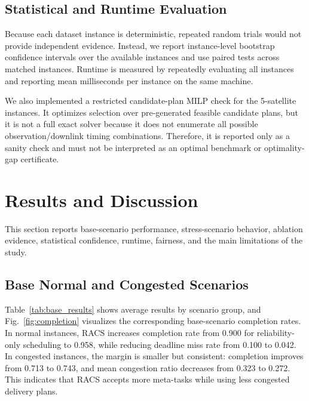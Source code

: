 \documentclass[conference]{IEEEtran}
\begin{document}
\subsection{Statistical and Runtime Evaluation}
Because each dataset instance is deterministic, repeated random trials would not provide independent evidence. Instead, we report instance-level bootstrap confidence intervals over the available instances and use paired tests across matched instances. Runtime is measured by repeatedly evaluating all instances and reporting mean milliseconds per instance on the same machine.

We also implemented a restricted candidate-plan MILP check for the 5-satellite instances. It optimizes selection over pre-generated feasible candidate plans, but it is not a full exact solver because it does not enumerate all possible observation/downlink timing combinations. Therefore, it is reported only as a sanity check and must not be interpreted as an optimal benchmark or optimality-gap certificate.

\section{Results and Discussion}
This section reports base-scenario performance, stress-scenario behavior, ablation evidence, statistical confidence, runtime, fairness, and the main limitations of the study.

\subsection{Base Normal and Congested Scenarios}
Table~\ref{tab:base_results} shows average results by scenario group, and Fig.~\ref{fig:completion} visualizes the corresponding base-scenario completion rates. In normal instances, RACS increases completion rate from 0.900 for reliability-only scheduling to 0.958, while reducing deadline miss rate from 0.100 to 0.042. In congested instances, the margin is smaller but consistent: completion improves from 0.713 to 0.743, and mean congestion ratio decreases from 0.323 to 0.272. This indicates that RACS accepts more meta-tasks while using less congested delivery plans.
\end{document}
